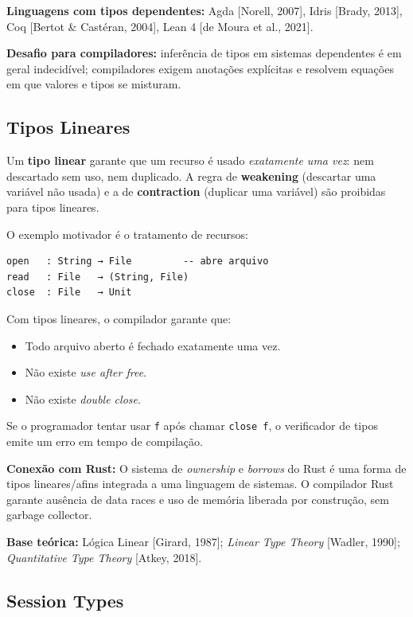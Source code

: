 \textbf{Linguagens com tipos dependentes:} Agda [Norell, 2007], Idris
[Brady, 2013], Coq [Bertot \& Castéran, 2004], Lean 4 [de Moura et
al., 2021].

\textbf{Desafio para compiladores:} inferência de tipos em sistemas
dependentes é em geral indecidível; compiladores exigem anotações
explícitas e resolvem equações em que valores e tipos se misturam.

\subsection{Tipos Lineares}

Um \textbf{tipo linear} garante que um recurso é usado \emph{exatamente
uma vez}: nem descartado sem uso, nem duplicado. A regra de
\textbf{weakening} (descartar uma variável não usada) e a de
\textbf{contraction} (duplicar uma variável) são proibidas para tipos
lineares.

O exemplo motivador é o tratamento de recursos:

\begin{verbatim}
open   : String → File         -- abre arquivo
read   : File   → (String, File)
close  : File   → Unit
\end{verbatim}

Com tipos lineares, o compilador garante que:

\begin{itemize}
  \item Todo arquivo aberto é fechado exatamente uma vez.
  \item Não existe \emph{use after free}.
  \item Não existe \emph{double close}.
\end{itemize}

Se o programador tentar usar \texttt{f} após chamar \texttt{close f},
o verificador de tipos emite um erro em tempo de compilação.

\textbf{Conexão com Rust:} O sistema de \emph{ownership} e
\emph{borrows} do Rust é uma forma de tipos lineares/afins integrada
a uma linguagem de sistemas. O compilador Rust garante ausência de
data races e uso de memória liberada por construção, sem garbage
collector.

\textbf{Base teórica:} Lógica Linear [Girard, 1987];
\emph{Linear Type Theory} [Wadler, 1990];
\emph{Quantitative Type Theory} [Atkey, 2018].

\subsection{Session Types}

